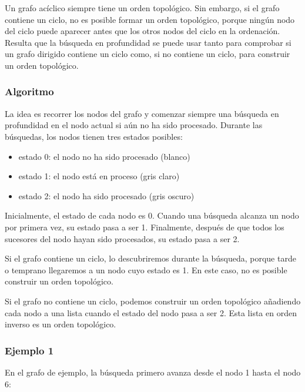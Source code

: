 Un grafo acíclico siempre tiene un orden topológico.
Sin embargo, si el grafo contiene un ciclo,
no es posible formar un orden topológico,
porque ningún nodo del ciclo puede aparecer
antes que los otros nodos del ciclo en la ordenación.
Resulta que la búsqueda en profundidad se puede usar
tanto para comprobar si un grafo dirigido contiene un ciclo
como, si no contiene un ciclo, para construir un orden topológico.

\subsubsection{Algoritmo}

La idea es recorrer los nodos del grafo
y comenzar siempre una búsqueda en profundidad en el nodo actual
si aún no ha sido procesado.
Durante las búsquedas, los nodos tienen tres estados posibles:

\begin{itemize}
\item estado 0: el nodo no ha sido procesado (blanco)
\item estado 1: el nodo está en proceso (gris claro)
\item estado 2: el nodo ha sido procesado (gris oscuro)
\end{itemize}

Inicialmente, el estado de cada nodo es 0.
Cuando una búsqueda alcanza un nodo por primera vez,
su estado pasa a ser 1.
Finalmente, después de que todos los sucesores del nodo hayan
sido procesados, su estado pasa a ser 2.

Si el grafo contiene un ciclo, lo descubriremos
durante la búsqueda, porque tarde o temprano
llegaremos a un nodo cuyo estado es 1.
En este caso, no es posible construir un orden topológico.

Si el grafo no contiene un ciclo, podemos construir
un orden topológico
añadiendo cada nodo a una lista cuando el estado del nodo pasa a ser 2.
Esta lista en orden inverso es un orden topológico.

\subsubsection{Ejemplo 1}

En el grafo de ejemplo, la búsqueda primero avanza
desde el nodo 1 hasta el nodo 6:

